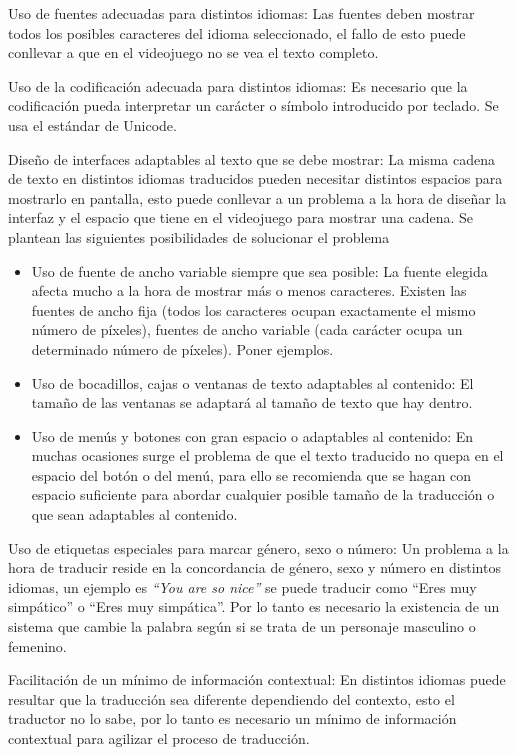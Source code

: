 Uso de fuentes adecuadas para distintos idiomas: Las fuentes deben mostrar todos los posibles caracteres del idioma seleccionado, el fallo de esto puede conllevar a que en el videojuego no se vea el texto completo.

Uso de la codificación adecuada para distintos idiomas: Es necesario que la codificación pueda interpretar un carácter o símbolo introducido por teclado. Se usa el estándar de Unicode.

Diseño de interfaces adaptables al texto que se debe mostrar: La misma cadena de texto en distintos idiomas traducidos pueden necesitar distintos espacios para mostrarlo en pantalla, esto puede conllevar a un problema a la hora de diseñar la interfaz y el espacio que tiene en el videojuego para mostrar una cadena.
Se plantean las siguientes posibilidades de solucionar el problema

\begin{itemize}
\item Uso de fuente de ancho variable siempre que sea posible: La fuente elegida afecta mucho a la hora de mostrar más o menos caracteres. Existen las fuentes de ancho fija (todos los caracteres ocupan exactamente el mismo número de píxeles), fuentes de ancho variable (cada carácter ocupa un determinado número de píxeles). Poner ejemplos.
\item Uso de bocadillos, cajas o ventanas de texto adaptables al contenido: El tamaño de las ventanas se adaptará al tamaño de texto que hay dentro.
\item Uso de menús y botones con gran espacio o adaptables al contenido: En muchas ocasiones surge el problema de que el texto traducido no quepa en el espacio del botón o del menú, para ello se recomienda que se hagan con espacio suficiente para abordar cualquier posible tamaño de la traducción o que sean adaptables al contenido.
\end{itemize}

Uso de etiquetas especiales para marcar género, sexo o número: Un problema a la hora de traducir reside en la concordancia de género, sexo y número en distintos idiomas, un ejemplo es \textit{``You are so nice''} se puede traducir como ``Eres muy simpático'' o ``Eres muy simpática''. Por lo tanto es necesario la existencia de un sistema que cambie la palabra según si se trata de un personaje masculino o femenino.

Facilitación de un mínimo de información contextual: En distintos idiomas puede resultar que la traducción sea diferente dependiendo del contexto, esto el traductor no lo sabe, por lo tanto es necesario un mínimo de información contextual para agilizar el proceso de traducción.


